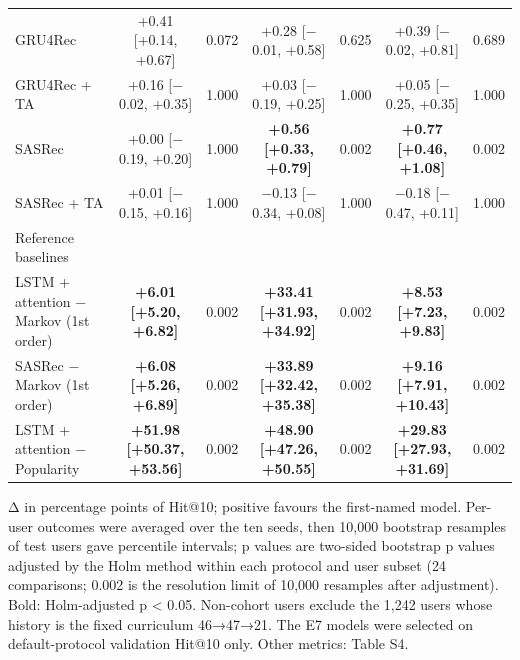 \begin{table}[t]
\begin{tabular}{lcccccc}
GRU4Rec & +0.41 [+0.14, +0.67] & 0.072 & +0.28 [$-$0.01, +0.58] & 0.625 & +0.39 [$-$0.02, +0.81] & 0.689 \\
GRU4Rec + TA & +0.16 [$-$0.02, +0.35] & 1.000 & +0.03 [$-$0.19, +0.25] & 1.000 & +0.05 [$-$0.25, +0.35] & 1.000 \\
SASRec & +0.00 [$-$0.19, +0.20] & 1.000 & \textbf{+0.56 [+0.33, +0.79]} & 0.002 & \textbf{+0.77 [+0.46, +1.08]} & 0.002 \\
SASRec + TA & +0.01 [$-$0.15, +0.16] & 1.000 & $-$0.13 [$-$0.34, +0.08] & 1.000 & $-$0.18 [$-$0.47, +0.11] & 1.000 \\
Reference baselines &  &  &  &  &  &  \\
LSTM + attention $-$ Markov (1st order) & \textbf{+6.01 [+5.20, +6.82]} & 0.002 & \textbf{+33.41 [+31.93, +34.92]} & 0.002 & \textbf{+8.53 [+7.23, +9.83]} & 0.002 \\
SASRec $-$ Markov (1st order) & \textbf{+6.08 [+5.26, +6.89]} & 0.002 & \textbf{+33.89 [+32.42, +35.38]} & 0.002 & \textbf{+9.16 [+7.91, +10.43]} & 0.002 \\
LSTM + attention $-$ Popularity & \textbf{+51.98 [+50.37, +53.56]} & 0.002 & \textbf{+48.90 [+47.26, +50.55]} & 0.002 & \textbf{+29.83 [+27.93, +31.69]} & 0.002 \\
\bottomrule
\end{tabular}
\par\smallskip\footnotesize Δ in percentage points of Hit@10; positive favours the first-named model. Per-user outcomes were averaged over the ten seeds, then 10,000 bootstrap resamples of test users gave percentile intervals; p values are two-sided bootstrap p values adjusted by the Holm method within each protocol and user subset (24 comparisons; 0.002 is the resolution limit of 10,000 resamples after adjustment). Bold: Holm-adjusted p < 0.05. Non-cohort users exclude the 1,242 users whose history is the fixed curriculum 46→47→21. The E7 models were selected on default-protocol validation Hit@10 only. Other metrics: Table S4.
\end{table}